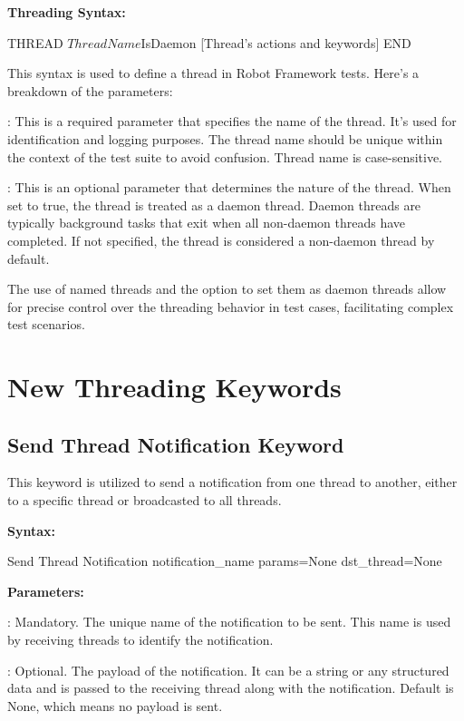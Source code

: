\textbf{Threading Syntax:}

\begin{robotcode}
THREAD    ${ThreadName}     ${IsDaemon}
       [Thread's actions and keywords]
END
\end{robotcode}

This syntax is used to define a thread in Robot Framework tests. Here's a breakdown of the parameters:

: This is a required parameter that specifies the name of the thread. It's used for identification and logging purposes. The thread name should be unique within the context of the test suite to avoid confusion. Thread name is case-sensitive.

: This is an optional parameter that determines the nature of the thread. When set to true, the thread is treated as a daemon thread. Daemon threads are typically background tasks that exit when all non-daemon threads have completed. If not specified, the thread is considered a non-daemon thread by default.

The use of named threads and the option to set them as daemon threads allow for precise control over the threading behavior in test cases, facilitating complex test scenarios.

\section{New Threading Keywords}

\subsection{Send Thread Notification Keyword}

This keyword is utilized to send a notification from one thread to another, either to a specific thread or broadcasted to all threads.

\textbf{Syntax:}

\begin{robotcode}
Send Thread Notification    notification_name    params=None     dst_thread=None
\end{robotcode}

\textbf{Parameters:}

: Mandatory. The unique name of the notification to be sent. This name is used by receiving threads to identify the notification.

: Optional. The payload of the notification. It can be a string or any structured data and is passed to the receiving thread along with the notification. Default is None, which means no payload is sent.

